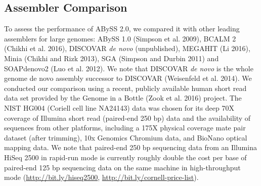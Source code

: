 \documentclass[
  12pt,
  oneside,
  openany]{book}
\begin{document}
\hypertarget{assembler-comparison}{%
\subsection{Assembler Comparison}\label{assembler-comparison}}

To assess the performance of ABySS 2.0, we compared it with other leading assemblers for large genomes: ABySS 1.0 (Simpson et al. 2009), BCALM 2 (Chikhi et al. 2016), DISCOVAR \emph{de novo} (unpublished), MEGAHIT (Li 2016), Minia (Chikhi and Rizk 2013), SGA (Simpson and Durbin 2011) and SOAPdenovo2 (Luo et al. 2012). We note that DISCOVAR \emph{de novo} is the whole genome de novo assembly successor to DISCOVAR (Weisenfeld et al. 2014). We conducted our comparison using a recent, publicly available human short read data set provided by the Genome in a Bottle (Zook et al. 2016) project. The NIST HG004 (Coriell cell line NA24143) data was chosen for its deep 70X coverage of Illumina short read (paired-end 250 bp) data and the availability of sequences from other platforms, including a 175X physical coverage mate pair dataset (after trimming), 10x Genomics Chromium data, and BioNano optical mapping data. We note that paired-end 250 bp sequencing data from an Illumina HiSeq 2500 in rapid-run mode is currently roughly double the cost per base of paired-end 125 bp sequencing data on the same machine in high-throughput mode (\url{http://bit.ly/hiseq2500}, \url{http://bit.ly/cornell-price-list}).
\end{document}
